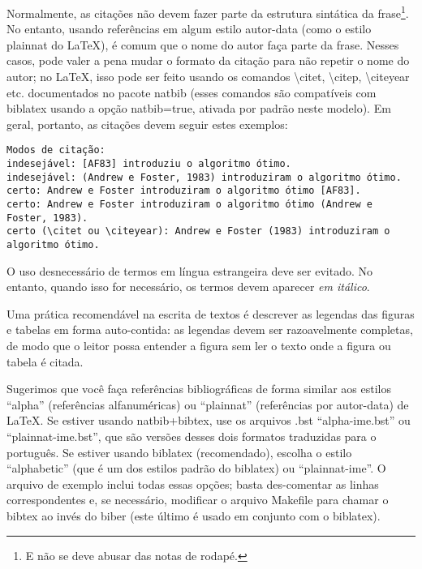 Normalmente, as citações não devem fazer parte da estrutura sintática da
frase\footnote{E não se deve abusar das notas de rodapé.}.
No entanto, usando referências em algum estilo autor-data (como o estilo
plainnat do \LaTeX{}), é comum que o nome do autor faça parte da frase. Nesses
casos, pode valer a pena mudar o formato da citação para não repetir o nome do
autor; no \LaTeX{}, isso pode ser feito usando os comandos
\textsf{\textbackslash{}citet}, \textsf{\textbackslash{}citep},
\textsf{\textbackslash{}citeyear} etc. documentados no pacote
natbib \citep{natbib} (esses comandos são compatíveis com biblatex
usando a opção \textsf{natbib=true}, ativada por padrão neste modelo). Em geral,
portanto, as citações devem seguir estes exemplos:

\footnotesize
\begin{verbatim}
Modos de citação:
indesejável: [AF83] introduziu o algoritmo ótimo.
indesejável: (Andrew e Foster, 1983) introduziram o algoritmo ótimo.
certo: Andrew e Foster introduziram o algoritmo ótimo [AF83].
certo: Andrew e Foster introduziram o algoritmo ótimo (Andrew e Foster, 1983).
certo (\citet ou \citeyear): Andrew e Foster (1983) introduziram o algoritmo ótimo.
\end{verbatim}
\normalsize

O uso desnecessário de termos em língua estrangeira deve ser evitado. No entanto,
quando isso for necessário, os termos devem aparecer \textit{em itálico}.

Uma prática recomendável na escrita de textos é descrever as
legendas das figuras e tabelas em forma auto-contida: as
legendas devem ser razoavelmente completas, de modo que o leitor possa entender
a figura sem ler o texto onde a figura ou tabela é citada.

Sugerimos que você faça referências bibliográficas de forma similar aos
estilos ``alpha'' (referências alfanuméricas) ou ``plainnat'' (referências
por autor-data) de \LaTeX{}.  Se estiver usando natbib+bibtex,
use os arquivos .bst ``alpha-ime.bst'' ou ``plainnat-ime.bst'', que são
versões desses dois formatos traduzidas para o português. Se estiver usando
biblatex (recomendado), escolha o estilo ``alphabetic''
(que é um dos estilos padrão do biblatex) ou ``plainnat-ime''. O arquivo de
exemplo inclui todas essas opções; basta des-comentar as linhas
correspondentes e, se necessário, modificar o arquivo Makefile para chamar
o bibtex ao invés do biber (este último é usado
em conjunto com o biblatex).

